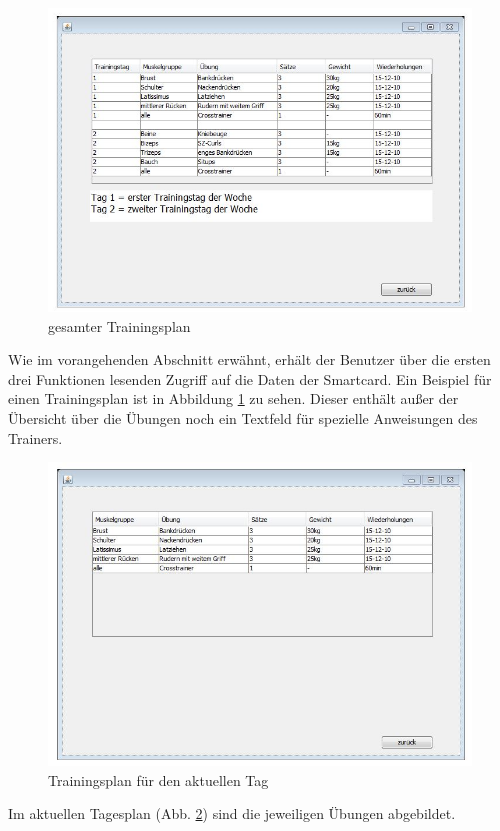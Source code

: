 \documentclass[a4paper,12pt]{article}
\begin{document}
\begin{figure}[H]
\begin{center}
 \includegraphics[width=0.75\hsize]{./trainingsplanView.jpg}
 \end{center}
\caption[Hauptmenü]{\label{planAll}gesamter Trainingsplan}
\end{figure}
Wie im vorangehenden Abschnitt erwähnt, erhält der Benutzer über die ersten drei Funktionen lesenden Zugriff auf die Daten der Smartcard. Ein Beispiel für einen Trainingsplan ist in Abbildung \ref{planAll} zu sehen. Dieser enthält außer der Übersicht über die Übungen noch ein Textfeld für spezielle Anweisungen des Trainers.
\begin{figure}[H]
\begin{center}
 \includegraphics[width=0.75\hsize]{./tagesplanView.jpg}
 \end{center}
\caption[Trainingsplan für den aktuellen Tag]{\label{planDay}Trainingsplan für den aktuellen Tag}
\end{figure}
Im aktuellen Tagesplan (Abb. \ref{planDay}) sind die jeweiligen Übungen abgebildet.
\end{document}
